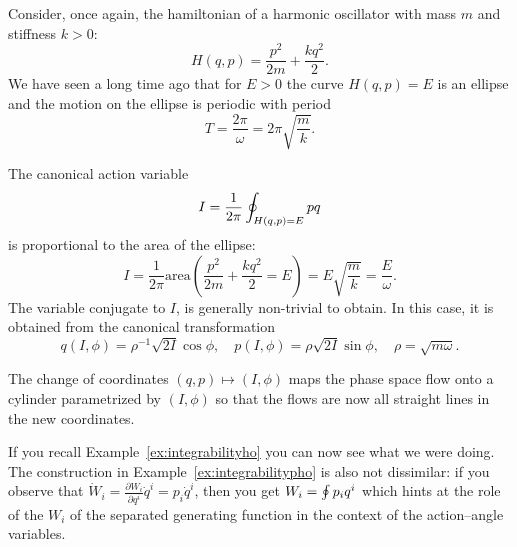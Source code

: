 \documentclass[english,fontsize=11pt,paper=a5,oneside]{scrbook}
\let\d\relax
\DeclareMathOperator{\d}{d}
\theoremstyle{definition}
\newenvironment{example}
  {\pushQED{\qed}\renewcommand{\qedsymbol}{$\lozenge$}\examplex}
  {\popQED\endexamplex}
\begin{document}
\begin{example}[Harmonic oscillator]
    Consider, once again, the hamiltonian of a harmonic oscillator with mass $m$ and stiffness $k>0$:
    \begin{equation}
        H(q,p) = \frac{p^2}{2m} + \frac{k q^2}{2}.
    \end{equation}
    We have seen a long time ago that for $E>0$ the curve $H(q,p) = E$ is an ellipse and the motion on the ellipse is periodic with period
    \begin{equation}
        T = \frac{2\pi}{\omega} = 2\pi \sqrt{\frac{m}{k}}.
    \end{equation}

    The canonical action variable
    \begin{equation}
        I = \frac1{2\pi}\oint_{H(q,p) = E} p \d q
    \end{equation}
    is proportional to the area of the ellipse:
    \begin{equation}
        I = \frac1{2\pi} \mathrm{area}\left(\frac{p^2}{2m} + \frac{k q^2}{2} = E\right) = E \sqrt{\frac{m}{k}} = \frac E \omega.
    \end{equation}
    The variable conjugate to $I$, is generally non-trivial to obtain. In this case, it is obtained from the canonical transformation
    \begin{equation}
        q(I, \phi) = \rho^{-1} \sqrt{2I} \cos\phi, \quad
        p(I, \phi) = \rho \sqrt{2I} \sin\phi, \quad
        \rho = \sqrt{m \omega}.
    \end{equation}

    The change of coordinates $(q,p) \mapsto (I, \phi)$ maps the phase space flow onto a cylinder parametrized by $(I, \phi)$ so that the flows are now all straight lines in the new coordinates.

    If you recall Example~\ref{ex:integrabilityho} you can now see what we were doing.
    The construction in Example~\ref{ex:integrabilitypho} is also not dissimilar: if you observe that $\dot W_i = \frac{\partial W_i}{\partial q^i} \dot q^i = p_i \dot q^i$, then you get $W_i = \oint p_i\d q^i$ which hints at the role of the $W_i$ of the separated generating function in the context of the action--angle variables.
\end{example}
\end{document}
